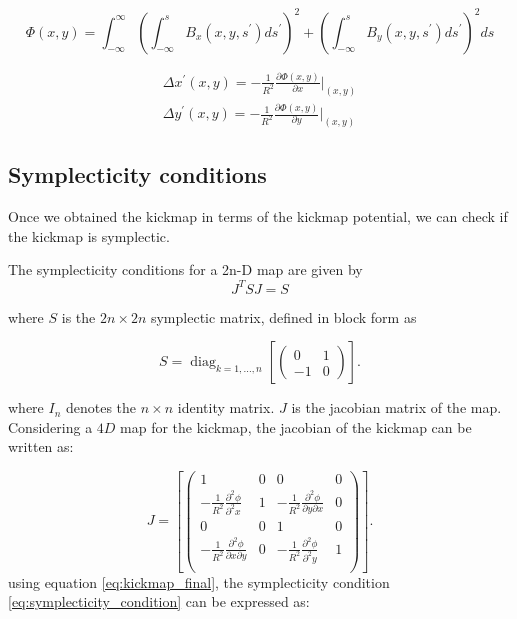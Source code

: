 \documentclass[a4paper,12pt]{article}
\begin{document}
\begin{equation}
    \Phi(x, y) = \int_{-\infty}^{\infty}\left(\int_{-\infty}^{s}B_x(x, y, s^{\prime})ds^{\prime}\right)^2 + 
    \left(\int_{-\infty}^{s}B_y(x, y, s^{\prime})ds^{\prime}\right)^2 ds
    \label{eq:kickmap_potential}
\end{equation}

\begin{equation}
    \begin{aligned}
        \Delta x^{\prime}(x, y) = -\frac{1}{R^2}\frac{\partial \Phi(x, y)}{\partial x}|_{(x,y)}\\
        \Delta y^{\prime}(x, y) = -\frac{1}{R^2}\frac{\partial \Phi(x, y)}{\partial y}|_{(x,y)}
    \end{aligned}
    \label{eq:kickmap_final}
\end{equation}


\subsection{Symplecticity conditions}

\par Once we obtained the kickmap in terms of the kickmap potential, we can check if the kickmap is symplectic. 

The symplecticity conditions for a 2n-D map are given by
\begin{equation}
    J^{T}SJ = S
    \label{eq:symplecticity_condition}
\end{equation}

where $S$ is the $2n \times 2n$ symplectic matrix, defined in block form as

\begin{equation}
    S
    =
    \operatorname{diag}_{k=1,\ldots,n}
    \left[
    \begin{pmatrix}
    0 & 1\\
    -1 & 0
    \end{pmatrix}
    \right].
\end{equation}

where $I_n$ denotes the $n \times n$ identity matrix. $J$ is the jacobian matrix of the map.
Considering a $4D$ map for the kickmap, the jacobian of the kickmap can be written as:


\begin{equation}
    J
    =
    \left[
    \begin{pmatrix}
    1 & 0 & 0 & 0\\
    -\frac{1}{R^2}\frac{\partial^2\phi}{\partial^2 x} & 1 & -\frac{1}{R^2}\frac{\partial^2\phi}{\partial y \partial x}  & 0\\
    0 & 0 & 1 & 0\\
    -\frac{1}{R^2}\frac{\partial^2\phi}{\partial x \partial y} & 0 & -\frac{1}{R^2}\frac{\partial^2\phi}{\partial^2 y} & 1\\
    \end{pmatrix}
    \right].
\end{equation}
using equation \eqref{eq:kickmap_final}, the symplecticity condition \eqref{eq:symplecticity_condition}
can be expressed as:
\end{document}
